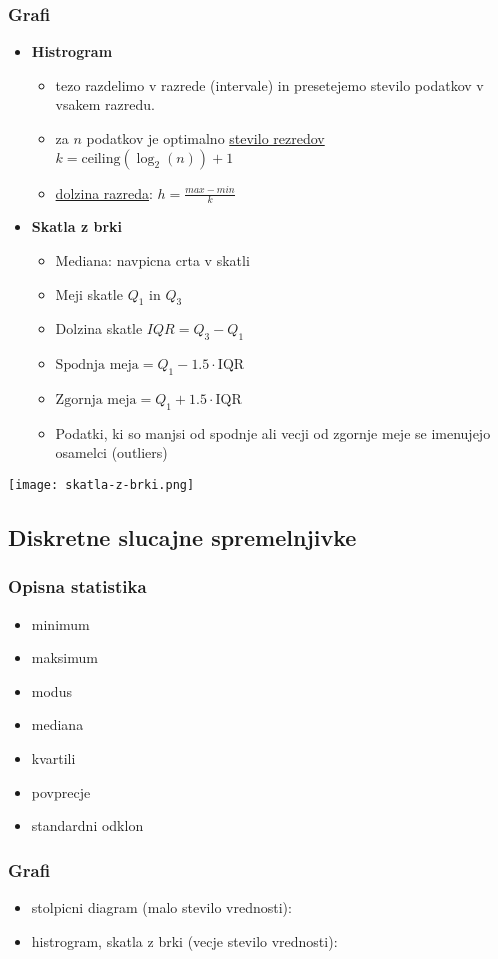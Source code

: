 \subsubsection{Grafi}
\begin{itemize}[leftmargin=*]
    \item \textbf{Histrogram}
        \begin{itemize}[leftmargin=*]
            \item tezo razdelimo v razrede (intervale) in presetejemo stevilo podatkov v vsakem razredu.
            \item za $n$ podatkov je optimalno \underline{stevilo rezredov}\\$k=\text{ceiling}(\log_2(n))+1$
            \item \underline{dolzina razreda}: $h=\frac{max-min}{k}$
        \end{itemize}

    \item \textbf{Skatla z brki}
        \begin{itemize}[leftmargin=*]
            \item Mediana: navpicna crta v skatli
            \item Meji skatle $Q_1$ in $Q_3$
            \item Dolzina skatle $IQR=Q_3-Q_1$
            \item $\text{Spodnja meja}=Q_1-1.5\cdot\text{IQR}$
            \item $\text{Zgornja meja}=Q_1+1.5\cdot\text{IQR}$
            \item Podatki, ki so manjsi od spodnje ali vecji od zgornje meje se imenujejo osamelci (outliers)

        \end{itemize}
\end{itemize}
\texttt{[image: skatla-z-brki.png]}
\subsection{Diskretne slucajne spremelnjivke}
\subsubsection{Opisna statistika}
\begin{itemize}[leftmargin=*]
    \item minimum
    \item maksimum
    \item modus
    \item mediana
    \item kvartili
    \item povprecje
    \item standardni odklon
\end{itemize}
\subsubsection{Grafi}
\begin{itemize}[leftmargin=*]
    \item stolpicni diagram (malo stevilo vrednosti):
    \item histrogram, skatla z brki (vecje stevilo vrednosti):
\end{itemize}

